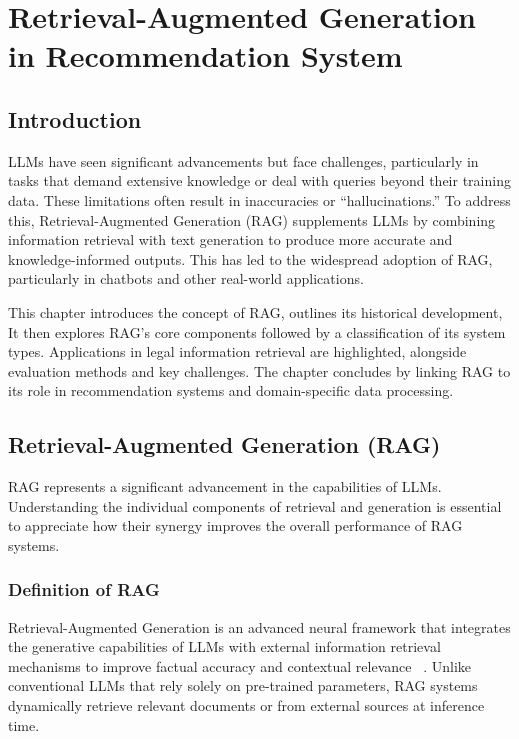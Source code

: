 \chapter{Retrieval-Augmented Generation in Recommendation System}
\pagestyle{fancy}
\pagestyle{fancy}\chead{} \pagestyle{fancy}\rhead{}

 \pagestyle{fancy}\rfoot{\thepage}
\section{Introduction}\label{start 1}

LLMs have seen significant advancements but face challenges, particularly in tasks that demand extensive knowledge or deal with queries beyond their training data. These limitations often result in inaccuracies or “hallucinations.” To address this, Retrieval-Augmented Generation (RAG) supplements LLMs by combining information retrieval with text generation to produce more accurate and knowledge-informed outputs. This has led to the widespread adoption of RAG, particularly in chatbots and other real-world applications.

This chapter introduces the concept of RAG, outlines its historical development, It then explores RAG’s core components followed by a classification of its system types. Applications in legal information retrieval are highlighted, alongside evaluation methods and key challenges. The chapter concludes by linking RAG to its role in recommendation systems and domain-specific data processing.

\section{Retrieval-Augmented Generation (RAG)}
RAG represents a significant advancement in the capabilities of LLMs. Understanding the individual components of retrieval and generation is essential to appreciate how their synergy improves the overall performance of RAG systems.
\subsection{Definition of RAG}
Retrieval-Augmented Generation is an advanced neural framework that integrates the generative capabilities of LLMs with external information retrieval mechanisms to improve factual accuracy and contextual relevance ~\citep{selvaraj2024}. Unlike conventional LLMs that rely solely on pre-trained parameters, RAG systems dynamically retrieve relevant documents or from external sources at inference time. 

